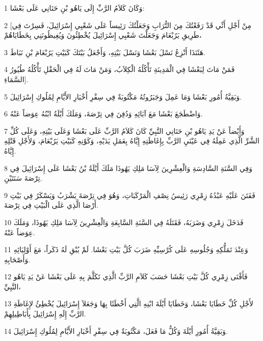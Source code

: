 \par 1 وَكَانَ كَلاَمُ الرَّبِّ إِلَى يَاهُو بْنِ حَنَانِي عَلَى بَعْشَا:
\par 2 [مِنْ أَجْلِ أَنِّي قَدْ رَفَعْتُكَ مِنَ التُّرَابِ وَجَعَلْتُكَ رَئِيساً عَلَى شَعْبِي إِسْرَائِيلَ، فَسِرْتَ فِي طَرِيقِ يَرُبْعَامَ وَجَعَلْتَ شَعْبِي إِسْرَائِيلَ يُخْطِئُونَ وَيُغِيظُونَنِي بِخَطَايَاهُمْ،
\par 3 هَئَنَذَا أَنْزِعُ نَسْلَ بَعْشَا وَنَسْلَ بَيْتِهِ، وَأَجْعَلُ بَيْتَكَ كَبَيْتِ يَرُبْعَامَ بْنِ نَبَاطَ.
\par 4 فَمَنْ مَاتَ لِبَعْشَا فِي الْمَدِينَةِ تَأْكُلُهُ الْكِلاَبُ، وَمَنْ مَاتَ لَهُ فِي الْحَقْلِ تَأْكُلُهُ طُيُورُ السَّمَاءِ].
\par 5 وَبَقِيَّةُ أُمُورِ بَعْشَا وَمَا عَمِلَ وَجَبَرُوتُهُ مَكْتُوبَةٌ فِي سِفْرِ أَخْبَارِ الأَيَّامِ لِمُلُوكِ إِسْرَائِيلَ.
\par 6 وَاضْطَجَعَ بَعْشَا مَعَ آبَائِهِ وَدُفِنَ فِي تِرْصَةَ، وَمَلَكَ أَيْلَةُ ابْنُهُ عِوَضاً عَنْهُ.
\par 7 وَأَيْضاً عَنْ يَدِ يَاهُو بْنِ حَنَانِي النَّبِيِّ كَانَ كَلاَمُ الرَّبِّ عَلَى بَعْشَا وَعَلَى بَيْتِهِ، وَعَلَى كُلِّ الشَّرِّ الَّذِي عَمِلَهُ فِي عَيْنَيِ الرَّبِّ بِإِغَاظَتِهِ إِيَّاهُ بِعَمَلِ يَدَيْهِ، وَكَوْنِهِ كَبَيْتِ يَرُبْعَامَ، وَلأَجْلِ قَتْلِهِ إِيَّاهُ.
\par 8 وَفِي السَّنَةِ السَّادِسَةِ وَالْعِشْرِينَ لِآسَا مَلِكِ يَهُوذَا مَلَكَ أَيْلَةُ بْنُ بَعْشَا عَلَى إِسْرَائِيلَ فِي تِرْصَةَ سَنَتَيْنِ.
\par 9 فَفَتَنَ عَلَيْهِ عَبْدُهُ زِمْرِي رَئِيسُ نِصْفِ الْمَرْكَبَاتِ، وَهُوَ فِي تِرْصَةَ يَشْرَبُ وَيَسْكَرُ فِي بَيْتِ أَرْصَا الَّذِي عَلَى الْبَيْتِ فِي تِرْصَةَ.
\par 10 فَدَخَلَ زِمْرِي وَضَرَبَهُ، فَقَتَلَهُ فِي السَّنَةِ السَّابِعَةِ وَالْعِشْرِينَ لِآسَا مَلِكِ يَهُوذَا، وَمَلَكَ عِوَضاً عَنْهُ.
\par 11 وَعِنْدَ تَمَلُّكِهِ وَجُلُوسِهِ عَلَى كُرْسِيِّهِ ضَرَبَ كُلَّ بَيْتِ بَعْشَا. لَمْ يُبْقِ لَهُ ذَكَراً، مَعَ أَوْلِيَائِهِ وَأَصْحَابِهِ.
\par 12 فَأَفْنَى زِمْرِي كُلَّ بَيْتِ بَعْشَا حَسَبَ كَلاَمِ الرَّبِّ الَّذِي تَكَلَّمَ بِهِ عَلَى بَعْشَا عَنْ يَدِ يَاهُو النَّبِيِّ،
\par 13 لأَجْلِ كُلِّ خَطَايَا بَعْشَا، وَخَطَايَا أَيْلَةَ ابْنِهِ الَّتِي أَخْطَئَا بِهَا وَجَعَلاَ إِسْرَائِيلَ يُخْطِئُ لإِغَاظَةِ الرَّبِّ إِلَهِ إِسْرَائِيلَ بِأَبَاطِيلِهِمْ.
\par 14 وَبَقِيَّةُ أُمُورِ أَيْلَةَ وَكُلُّ مَا فَعَلَ، مَكْتُوبَةٌ فِي سِفْرِ أَخْبَارِ الأَيَّامِ لِمُلُوكِ إِسْرَائِيلَ.

